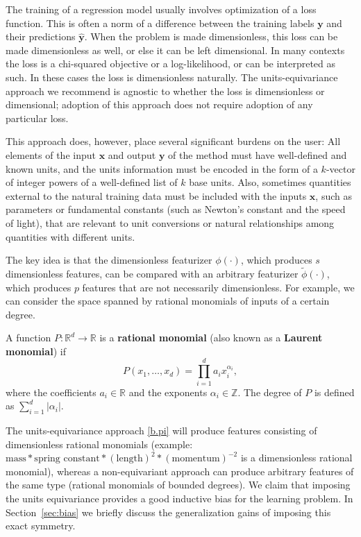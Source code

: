 \documentclass[twoside,11pt]{article}
\newcommand{\sectionname}{Section}
\newcommand{\secref}[1]{\sectionname~\ref{#1}}
\begin{document}
The training of a regression model usually involves optimization of a loss function.
This is often a norm of a difference between the training labels $\mathbf y$ and their predictions $\hat{\mathbf{y}}$.
When the problem is made dimensionless, this loss can be made dimensionless as well, or else
it can be left dimensional.
In many contexts the loss is a chi-squared objective or a log-likelihood, or can be interpreted as such.
In these cases the loss is dimensionless naturally.
The units-equivariance approach we recommend is agnostic to whether the loss is dimensionless or dimensional; adoption of this approach does not require adoption of any particular loss.

This approach does, however, place several significant burdens on the user:
All elements of the input $\mathbf x$ and output $\mathbf y$ of the method must have well-defined and known units, and the units information must be encoded in the form of a $k$-vector of integer powers of a well-defined list of $k$ base units.
Also, sometimes quantities external to the natural training data must be included with the inputs $\mathbf x$, such as parameters or fundamental constants (such as Newton's constant and the speed of light), that are relevant to unit conversions or natural relationships among quantities with different units.

The key idea is that the dimensionless featurizer $\phi(\cdot)$, which produces $s$ dimensionless features, can be compared with an arbitrary featurizer $\tilde{\phi}(\cdot)$, which produces $p$ features that are not necessarily dimensionless. For example, we can consider the space spanned by rational monomials of inputs of a certain degree. 
\begin{definition}
A function $P:\mathbb R^d \to \mathbb R$ is a \textbf{rational monomial} (also known as a \textbf{Laurent monomial}) if 
\begin{equation}
    P(x_1,\ldots, x_d) = \prod_{i=1}^d a_i x_i^{\alpha_i},
\end{equation}
where the coefficients $a_i\in \mathbb R$ and the exponents $\alpha_i \in \mathbb Z$. The degree of $P$ is defined as $\sum_{i=1}^d |\alpha_i|$.
\end{definition}

The units-equivariance approach \eqref{b.pi} will produce features consisting of dimensionless rational monomials (example: $\text{mass}*\text{spring constant}*(\text{length})^2*(\text{momentum})^{-2}$ is a dimensionless rational monomial), whereas a non-equivariant approach can produce arbitrary features of the same type (rational monomials of bounded degrees). We claim that imposing the units equivariance provides a good inductive bias for the learning problem. In \secref{sec:bias} we briefly discuss the generalization gains of imposing this exact symmetry.
\end{document}
